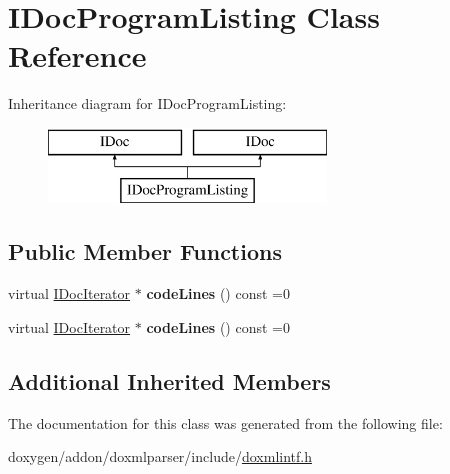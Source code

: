 \hypertarget{class_i_doc_program_listing}{}\section{I\+Doc\+Program\+Listing Class Reference}
\label{class_i_doc_program_listing}
Inheritance diagram for I\+Doc\+Program\+Listing\+:\begin{figure}[H]
\begin{center}
\leavevmode
\includegraphics[height=2.000000cm]{class_i_doc_program_listing}
\end{center}
\end{figure}
\subsection*{Public Member Functions}
\begin{DoxyCompactItemize}
\item 
\mbox{\label{class_i_doc_program_listing_abd62b909062828ba75d7bacc8c28721e}} 
virtual \mbox{\hyperlink{class_i_doc_iterator}{I\+Doc\+Iterator}} $\ast$ {\bfseries code\+Lines} () const =0
\item 
\mbox{\label{class_i_doc_program_listing_abd62b909062828ba75d7bacc8c28721e}} 
virtual \mbox{\hyperlink{class_i_doc_iterator}{I\+Doc\+Iterator}} $\ast$ {\bfseries code\+Lines} () const =0
\end{DoxyCompactItemize}
\subsection*{Additional Inherited Members}


The documentation for this class was generated from the following file\+:\begin{DoxyCompactItemize}
\item 
doxygen/addon/doxmlparser/include/\mbox{\hyperlink{include_2doxmlintf_8h}{doxmlintf.\+h}}\end{DoxyCompactItemize}
